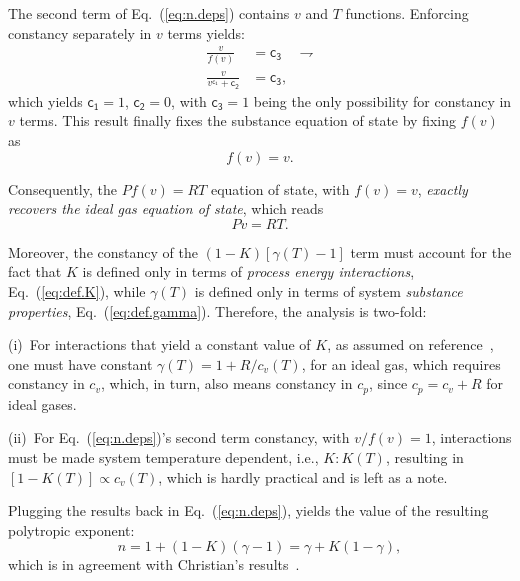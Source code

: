 \documentclass[fleqn,11pt]{SelfArx}
\begin{document}
    The second term of Eq.~(\ref{eq:n.deps}) contains $v$ and $T$ functions. Enforcing constancy
    separately in $v$ terms yields:
    \begin{align}
        \frac{v}{f(v)} & = \mathsf{c_3} & \rightharpoondown \\
        \frac{v}{v^{\mathsf{c_1}} + \mathsf{c_2}} & = \mathsf{c_3},
        \label{eq:f.three.consts}
    \end{align}
    \noindent which yields $\mathsf{c_1} = 1$, $\mathsf{c_2} = 0$, with $\mathsf{c_3} = 1$ being
    the only possibility for constancy in $v$ terms. This result  finally  fixes  the  substance
    equation of state by fixing $f(v)$ as
    \begin{equation}
        f(v) = v.
        \label{eq:f}
    \end{equation}

    Consequently, the $Pf(v) = RT$ equation of state, with $f(v) =  v$,  \emph{exactly  recovers
    the ideal gas equation of state\/}, which reads
    \begin{equation}
        Pv = RT.
        \label{eq:ideal.gas.EoS}
    \end{equation}

    Moreover, the constancy of the $(1 - K)[\gamma(T) - 1]$ term must account for the fact  that
    $K$ is defined only in terms of \emph{process  energy  interactions},  Eq.~(\ref{eq:def.K}),
    while  $\gamma(T)$  is  defined  only  in  terms  of  system  \emph{substance   properties},
    Eq.~(\ref{eq:def.gamma}). Therefore, the analysis is two-fold:

    (i)~For   interactions   that   yield   a   constant   value   of   $K$,   as   assumed   on
    reference~\cite{2012-ChristiansJ-IntJMechEngEduc}, one must have constant $\gamma(T) =  1  +
    R/c_v(T)$, for an ideal gas, which requires constancy in $c_v$, which, in turn,  also  means
    constancy in $c_p$, since $c_p = c_v + R$ for ideal gases.

    (ii)~For Eq.~(\ref{eq:n.deps})'s second term constancy, with $v/f(v) = 1$, interactions must
    be made system temperature dependent, i.e., $K\!:\!K(T)$, resulting in $[1 -  K(T)]  \propto
    c_v(T)$, which is hardly practical and is left as a note.

    Plugging the results back in  Eq.~(\ref{eq:n.deps}),  yields  the  value  of  the  resulting
    polytropic exponent:
    \begin{equation}
        n = 1 + (1 - K)(\gamma - 1) = \gamma + K(1 - \gamma),
        \label{eq:n.final}
    \end{equation}
    \noindent        which        is        in        agreement         with         Christian's
    results~\cite{2012-ChristiansJ-IntJMechEngEduc}.
\end{document}
